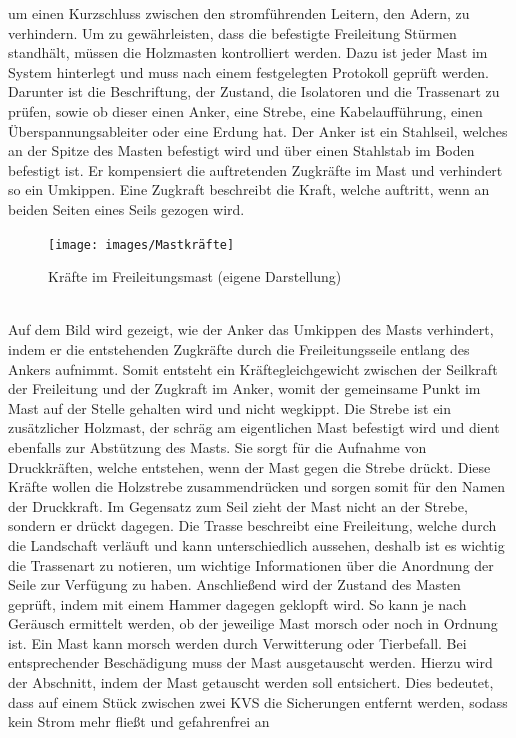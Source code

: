 um einen Kurzschluss zwischen den stromführenden Leitern, den Adern, zu verhindern. Um zu gewährleisten, dass die befestigte Freileitung Stürmen standhält,
müssen die Holzmasten kontrolliert werden. Dazu ist jeder Mast im System hinterlegt und muss nach einem festgelegten Protokoll geprüft werden. Darunter ist 
die Beschriftung, der Zustand, die Isolatoren und die Trassenart zu prüfen, sowie ob dieser einen Anker, eine Strebe, eine Kabelaufführung, einen 
Überspannungsableiter oder eine Erdung hat. Der Anker ist ein Stahlseil, welches an der Spitze des Masten befestigt wird und über einen Stahlstab im Boden 
befestigt ist. Er kompensiert die auftretenden Zugkräfte im Mast und verhindert so ein Umkippen. Eine Zugkraft beschreibt die Kraft, welche auftritt, wenn 
an beiden Seiten eines Seils gezogen wird. 
\begin{figure}[hbt]
    \centering
    \texttt{[image: images/Mastkräfte]}
    \caption[Isolator]{Kräfte im Freileitungsmast (eigene Darstellung)}
    \label{fig:Kräfte im Mast}
\end{figure}
\\Auf dem Bild wird gezeigt, wie der Anker das Umkippen des Masts verhindert, indem er die entstehenden Zugkräfte durch die Freileitungsseile entlang des Ankers 
aufnimmt. Somit entsteht ein Kräftegleichgewicht zwischen der Seilkraft der Freileitung und der Zugkraft im Anker, womit der gemeinsame Punkt im Mast auf der 
Stelle gehalten wird und nicht wegkippt. Die Strebe ist ein zusätzlicher Holzmast, der schräg am eigentlichen Mast befestigt wird und dient ebenfalls zur 
Abstützung des Masts. Sie sorgt für die Aufnahme von Druckkräften, welche entstehen, wenn der Mast gegen die Strebe drückt. Diese Kräfte wollen die Holzstrebe
zusammendrücken und sorgen somit für den Namen der Druckkraft. Im Gegensatz zum Seil zieht der Mast nicht an der Strebe, sondern er drückt dagegen. Die 
Trasse beschreibt eine Freileitung, welche durch die Landschaft verläuft und kann unterschiedlich aussehen, deshalb ist es wichtig die Trassenart zu notieren,
um wichtige Informationen über die Anordnung der Seile zur Verfügung zu haben. Anschließend wird der Zustand des Masten geprüft, indem mit einem Hammer 
dagegen geklopft wird. So kann je nach Geräusch ermittelt werden, ob der jeweilige Mast morsch oder noch in Ordnung ist. Ein Mast kann morsch werden durch 
Verwitterung oder Tierbefall. Bei entsprechender Beschädigung muss der Mast ausgetauscht werden. Hierzu wird der Abschnitt, indem der Mast getauscht werden 
soll entsichert. Dies bedeutet, dass auf einem Stück zwischen zwei KVS die Sicherungen entfernt werden, sodass kein Strom mehr fließt und gefahrenfrei an 
